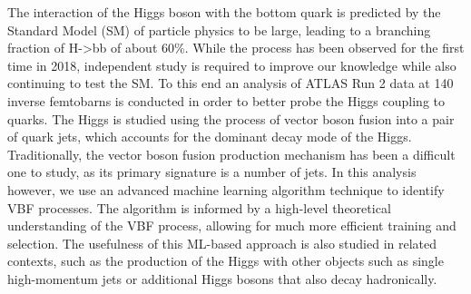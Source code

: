 \documentclass[paper=a4,fontsize=12pt]{article}
\begin{document}
The interaction of the Higgs boson with the bottom quark is predicted by the Standard Model (SM) of particle physics to be large, leading to a branching fraction of H->bb of about 60\%. While the process has been observed for the first time in 2018, independent study is required to improve our knowledge while also continuing to test the SM. To this end an analysis of ATLAS Run 2 data at 140 inverse femtobarns is conducted in order to better probe the Higgs coupling to quarks. The Higgs is studied using the process of vector boson fusion into a pair of quark jets, which accounts for the dominant decay mode of the Higgs. Traditionally, the vector boson fusion production mechanism has been a difficult one to study, as its primary signature is a number of jets. In this analysis however, we use an advanced machine learning algorithm technique to identify VBF processes. The algorithm is informed by a high-level theoretical understanding of the VBF process, allowing for much more efficient training and selection. The usefulness of this ML-based approach is also studied in related contexts, such as the production of the Higgs with other objects such as single high-momentum jets or additional Higgs bosons that also decay hadronically.
\end{document}
